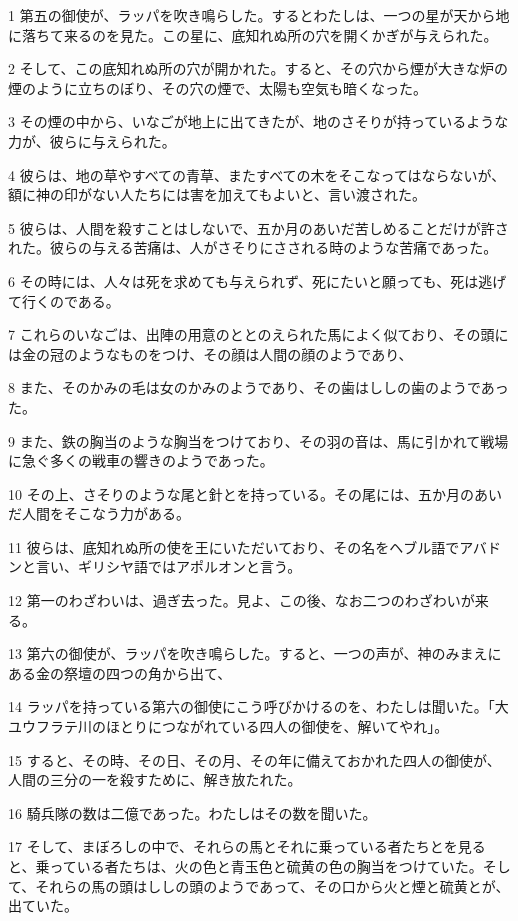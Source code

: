 \par 1 第五の御使が、ラッパを吹き鳴らした。するとわたしは、一つの星が天から地に落ちて来るのを見た。この星に、底知れぬ所の穴を開くかぎが与えられた。
\par 2 そして、この底知れぬ所の穴が開かれた。すると、その穴から煙が大きな炉の煙のように立ちのぼり、その穴の煙で、太陽も空気も暗くなった。
\par 3 その煙の中から、いなごが地上に出てきたが、地のさそりが持っているような力が、彼らに与えられた。
\par 4 彼らは、地の草やすべての青草、またすべての木をそこなってはならないが、額に神の印がない人たちには害を加えてもよいと、言い渡された。
\par 5 彼らは、人間を殺すことはしないで、五か月のあいだ苦しめることだけが許された。彼らの与える苦痛は、人がさそりにさされる時のような苦痛であった。
\par 6 その時には、人々は死を求めても与えられず、死にたいと願っても、死は逃げて行くのである。
\par 7 これらのいなごは、出陣の用意のととのえられた馬によく似ており、その頭には金の冠のようなものをつけ、その顔は人間の顔のようであり、
\par 8 また、そのかみの毛は女のかみのようであり、その歯はししの歯のようであった。
\par 9 また、鉄の胸当のような胸当をつけており、その羽の音は、馬に引かれて戦場に急ぐ多くの戦車の響きのようであった。
\par 10 その上、さそりのような尾と針とを持っている。その尾には、五か月のあいだ人間をそこなう力がある。
\par 11 彼らは、底知れぬ所の使を王にいただいており、その名をヘブル語でアバドンと言い、ギリシヤ語ではアポルオンと言う。
\par 12 第一のわざわいは、過ぎ去った。見よ、この後、なお二つのわざわいが来る。
\par 13 第六の御使が、ラッパを吹き鳴らした。すると、一つの声が、神のみまえにある金の祭壇の四つの角から出て、
\par 14 ラッパを持っている第六の御使にこう呼びかけるのを、わたしは聞いた。「大ユウフラテ川のほとりにつながれている四人の御使を、解いてやれ」。
\par 15 すると、その時、その日、その月、その年に備えておかれた四人の御使が、人間の三分の一を殺すために、解き放たれた。
\par 16 騎兵隊の数は二億であった。わたしはその数を聞いた。
\par 17 そして、まぼろしの中で、それらの馬とそれに乗っている者たちとを見ると、乗っている者たちは、火の色と青玉色と硫黄の色の胸当をつけていた。そして、それらの馬の頭はししの頭のようであって、その口から火と煙と硫黄とが、出ていた。
